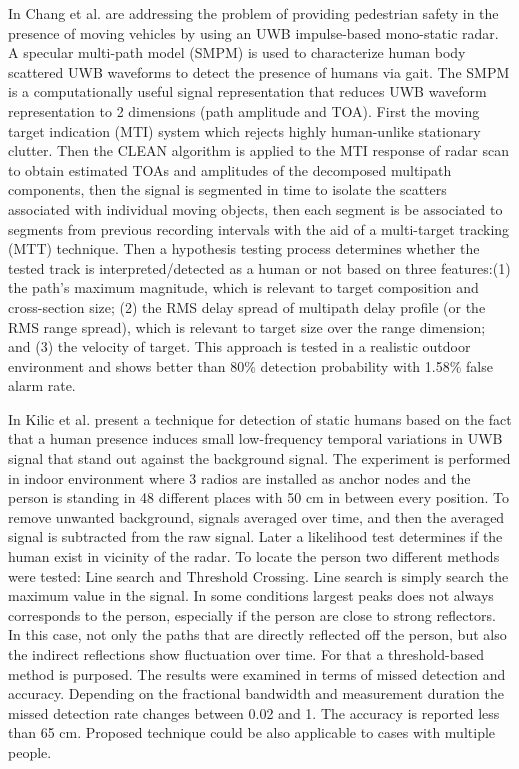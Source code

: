 In \cite{Chang2009} Chang et al. are addressing the problem of providing pedestrian safety in the presence of moving vehicles by using an UWB impulse-based mono-static radar. A specular multi-path model (SMPM) is used to characterize human body scattered UWB waveforms to detect the presence of humans via gait. The SMPM is a computationally useful signal representation that reduces UWB waveform representation to 2 dimensions (path amplitude and TOA). First the moving target indication (MTI) system which rejects highly human-unlike stationary clutter. Then the CLEAN algorithm is applied to the MTI response of radar scan to obtain estimated TOAs and amplitudes of the decomposed multipath components, then the signal is segmented in time to isolate the scatters associated with individual moving objects, then each segment is be associated to segments from previous recording intervals with the aid of a multi-target tracking (MTT) technique. Then a hypothesis testing process determines whether the tested track is interpreted/detected as a human or not based on three features:(1) the path’s maximum magnitude, which is relevant to target composition and cross-section size; (2) the RMS delay spread of multipath delay profile (or the RMS range spread), which is relevant to target size over the range dimension; and (3) the velocity of target. This approach is tested in a realistic outdoor environment and shows better than 80\% detection probability with 1.58\% false alarm rate.

In \cite{Kilic2013} Kilic et al. present a technique for detection of static humans based on the fact that a human presence induces small low-frequency temporal variations in UWB signal that stand out against the background signal. The experiment is performed in indoor environment where 3 radios are installed as anchor nodes and the person is standing in 48 different places with 50 cm in between every position. To remove unwanted background, signals averaged over time, and then  the averaged signal is subtracted from the raw signal. Later a likelihood test determines if the human exist in vicinity of the radar. To locate the person two different methods were tested: Line search and Threshold Crossing. Line search is simply search the maximum value in the signal. In some conditions largest peaks does not always corresponds to the person, especially if the person are close to strong reflectors. In this case, not only the paths that are directly reflected off the person, but also the indirect reflections show fluctuation over time. For that a threshold-based method is purposed. The results were examined in terms of missed detection and accuracy.  Depending on the fractional bandwidth and measurement duration the missed detection rate changes between 0.02 and 1. The accuracy is reported less than 65 cm. Proposed technique could be also applicable to cases with multiple people.

